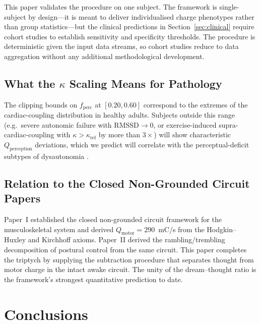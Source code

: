 \documentclass[11pt,twocolumn,a4paper]{article}
\theoremstyle{definition}
\theoremstyle{remark}
\newcommand{\Qmo}{Q_{\mathrm{motor}}}
\newcommand{\Qpe}{Q_{\mathrm{perception}}}
\newcommand{\RMSSD}{\mathrm{RMSSD}}
\begin{document}
This paper validates the procedure on one subject. The framework is
single-subject by design---it is meant to deliver individualised
charge phenotypes rather than group statistics---but the clinical
predictions in Section~\ref{sec:clinical} require cohort studies to
establish sensitivity and specificity thresholds. The procedure is
deterministic given the input data streams, so cohort studies reduce
to data aggregation without any additional methodological
development.

\subsection{What the $\kappa$ Scaling Means for Pathology}

The clipping bounds on $f_{\mathrm{perc}}$ at $[0.20,0.60]$ correspond
to the extremes of the cardiac-coupling distribution in healthy
adults. Subjects outside this range (e.g.\ severe autonomic failure
with $\RMSSD\to 0$, or exercise-induced supra-cardiac-coupling with
$\kappa>\kappa_{\mathrm{ref}}$ by more than $3\times$) will show
characteristic $\Qpe$ deviations, which we predict will correlate
with the perceptual-deficit subtypes of dysautonomia
\citep{freeman2011}.

\subsection{Relation to the Closed Non-Grounded Circuit Papers}

Paper~I \citep{sachikonye2026musculo} established the closed
non-grounded circuit framework for the musculoskeletal system and
derived $\Qmo=290$~mC/s from the Hodgkin--Huxley and Kirchhoff axioms.
Paper~II \citep{sachikonye2026rambling} derived the
rambling/trembling decomposition of postural control from the same
circuit. This paper completes the triptych by supplying the
subtraction procedure that separates thought from motor charge in
the intact awake circuit. The unity of the dream--thought ratio is
the framework's strongest quantitative prediction to date.

\section{Conclusions}
\end{document}
